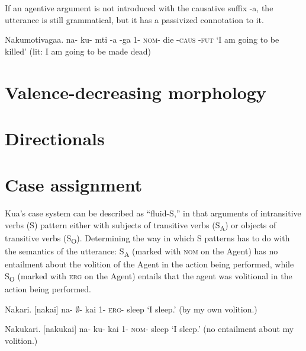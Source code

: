 \documentclass[12pt]{article}
\newcommand{\R}{\textipa{R}} %
\newcommand{\N}{\textipa{N}} %
\newcommand{\OO}{\textipa{O}} %
\newcommand{\B}{\textipa{B}} %
\newcommand{\0}{$\emptyset$} %
\newcommand{\D}{\scshape} %
\newcommand{\nom}{\D{nom}}
\newcommand{\caus}{\D{caus}}
\newcommand{\fut}{\D{fut}}
\begin{document}
		If an agentive argument is not introduced with the causative suffix -\B a, the utterance is still grammatical, but it has a passivized 
		 connotation to it.

		 	\begin{example}
		 	\label{ex:noncausative}
		 		Nakumotivagaa. \textipa{[nakumOtiBaga:]}
		 		\gll na- ku- m\OO ti -\B a -ga\textipa{:}
		 		1- {\nom-} die {-\caus} {-\fut}
		 		\glt `I am going to be killed' (lit: I am going to be made dead) %
		 		\glend
		 	\end{example}



	\section{Valence-decreasing morphology}

	\section{Directionals}

	\section{Case assignment}
		Ku\R a\N\OO 's case system can be described as ``fluid-S,'' in that arguments of intransitive verbs (S) pattern either with subjects of transitive verbs (S\textsubscript{A}) or objects of transitive verbs (S\textsubscript{O}). Determining the way in which S patterns has to do with the semantics of the utterance: S\textsubscript{A} (marked with {\D{nom}} on the Agent) has no entailment about the volition of the Agent in the action being performed, while S\textsubscript{O} (marked with {\D{erg}} on the Agent) entails that the agent was volitional in the action being performed.

		\begin{example}
		\label{ex:case_erg}
			Nakari. [naka\R i]
			\gll na- \0- ka\R i
			{\D{1}}- {\D{erg}}- sleep
			\glt `I sleep.' (by my own volition.)
			\glend
		\end{example}

		\begin{example}
		\label{ex:case_abs}
			Nakukari. [nakuka\R i]
			\gll na- ku- ka\R i
			{\D{1}}- {\D{nom}}- sleep
			\glt `I sleep.' (no entailment about my volition.)
			\glend
		\end{example}
\end{document}
